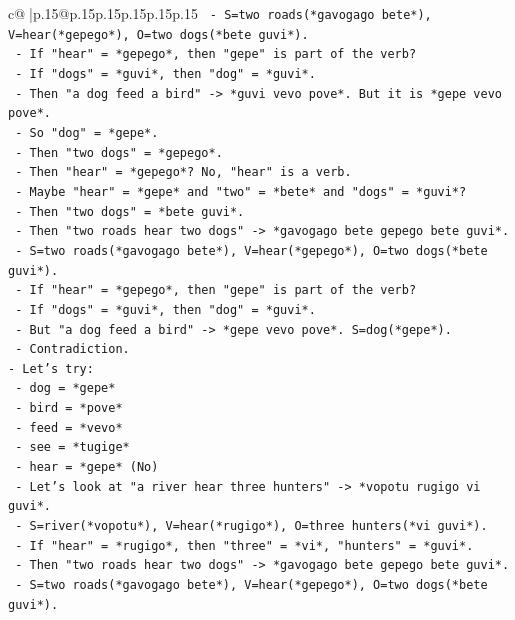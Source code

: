 \documentclass{article}
\begin{document}
{\begin{supertabular}{c@{$\;$}|p{.15\linewidth}@{}p{.15\linewidth}p{.15\linewidth}p{.15\linewidth}p{.15\linewidth}p{.15\linewidth}}
{{{\texttt{    {-} S=two roads(*gavogago bete*), V=hear(*gepego*), O=two dogs(*bete guvi*).} \\
\texttt{    {-} If "hear" = *gepego*, then "gepe" is part of the verb?} \\
\texttt{    {-} If "dogs" = *guvi*, then "dog" = *guvi*.} \\
\texttt{    {-} Then "a dog feed a bird" {-}> *guvi vevo pove*. But it is *gepe vevo pove*.} \\
\texttt{    {-} So "dog" = *gepe*.} \\
\texttt{    {-} Then "two dogs" = *gepego*.} \\
\texttt{    {-} Then "hear" = *gepego*? No, "hear" is a verb.} \\
\texttt{    {-} Maybe "hear" = *gepe* and "two" = *bete* and "dogs" = *guvi*?} \\
\texttt{    {-} Then "two dogs" = *bete guvi*.} \\
\texttt{    {-} Then "two roads hear two dogs" {-}> *gavogago bete gepego bete guvi*.} \\
\texttt{      {-} S=two roads(*gavogago bete*), V=hear(*gepego*), O=two dogs(*bete guvi*).} \\
\texttt{      {-} If "hear" = *gepego*, then "gepe" is part of the verb?} \\
\texttt{      {-} If "dogs" = *guvi*, then "dog" = *guvi*.} \\
\texttt{      {-} But "a dog feed a bird" {-}> *gepe vevo pove*. S=dog(*gepe*).} \\
\texttt{      {-} Contradiction.} \\
\texttt{{-} Let's try:} \\
\texttt{  {-} dog = *gepe*} \\
\texttt{  {-} bird = *pove*} \\
\texttt{  {-} feed = *vevo*} \\
\texttt{  {-} see = *tugige*} \\
\texttt{  {-} hear = *gepe* (No)} \\
\texttt{  {-} Let's look at "a river hear three hunters" {-}> *vopotu rugigo vi guvi*.} \\
\texttt{    {-} S=river(*vopotu*), V=hear(*rugigo*), O=three hunters(*vi guvi*).} \\
\texttt{    {-} If "hear" = *rugigo*, then "three" = *vi*, "hunters" = *guvi*.} \\
\texttt{    {-} Then "two roads hear two dogs" {-}> *gavogago bete gepego bete guvi*.} \\
\texttt{      {-} S=two roads(*gavogago bete*), V=hear(*gepego*), O=two dogs(*bete guvi*).} \\
}}}
\end{supertabular}}
\end{document}
